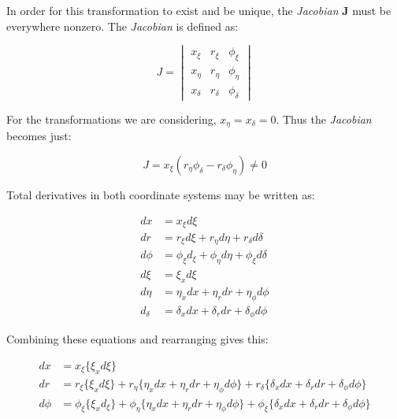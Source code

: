 In order for this transformation to exist and be unique, the {\it Jacobian} {\bf J}
must be everywhere nonzero. The {\it Jacobian} is defined as:

\begin{equation}
  J = \begin{vmatrix}
    x_\xi & r_\xi & \phi_\xi \\
    x_\eta & r_\eta & \phi_\eta \\
    x_\delta & r_\delta & \phi_\delta
  \end{vmatrix}
\end{equation}

For the transformations we are considering, $x_\eta = x_\delta = 0$. Thus the {\it Jacobian} becomes just:

\begin{equation}
  J = x_\xi \left( r_\eta\phi_\delta - r_\delta\phi_\eta \right) \neq 0
\end{equation}

Total derivatives in both coordinate systems may be written as:

\begin{equation}
  \begin{aligned}
    dx &= x_\xi d\xi \\
    dr &= r_\xi d\xi + r_\eta d\eta + r_\delta d\delta \\
    d\phi &= \phi_\xi d_\xi + \phi_\eta d\eta + \phi_\xi d\delta \\
    d\xi &= \xi_x d\xi \\
    d\eta &= \eta_x dx + \eta_r dr + \eta_\phi d\phi \\
    d_\delta &= \delta_xdx + \delta_r dr + \delta_\phi d\phi
  \end{aligned}
\end{equation}

Combining these equations and rearranging gives this:

\begin{equation}
  \begin{aligned}
    dx &= x_\xi \{ \xi_x d\xi \} \\
    dr &= r_\xi \{ \xi_x d\xi \} + r_\eta \{ \eta_x dx + \eta_r dr + \eta_\phi d\phi \} + r_\delta \{ \delta_xdx + \delta_r dr + \delta_\phi d\phi
 \} \\
    d\phi &= \phi_\xi \{ \xi_x d_\xi \} + \phi_\eta \{ \eta_x dx + \eta_r dr + \eta_\phi d\phi \} + \phi_\xi \{ \delta_xdx + \delta_r dr + \delta_\phi d\phi
 \} 
  \end{aligned}
\end{equation}

